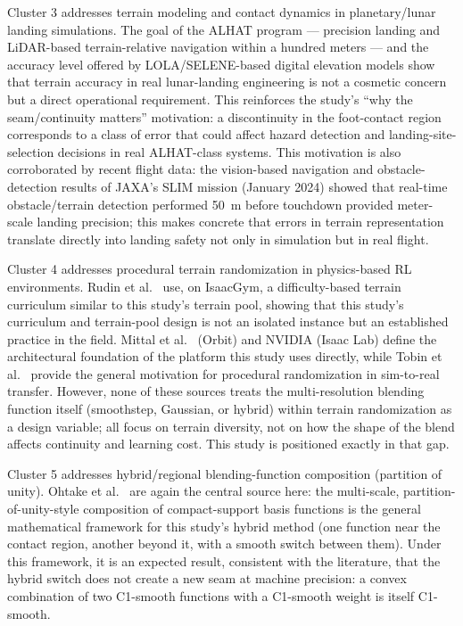 Cluster 3 addresses terrain modeling and contact dynamics in
planetary/lunar landing simulations. The goal of the ALHAT program
\citep{johnson2008overview,nasajpl_alhat} --- precision landing and
LiDAR-based terrain-relative navigation within a hundred meters --- and
the accuracy level offered by LOLA/SELENE-based digital elevation models
\citep{barker2016lunar} show that terrain accuracy in real lunar-landing
engineering is not a cosmetic concern but a direct operational
requirement. This reinforces the study's ``why the
seam/continuity matters'' motivation: a discontinuity in the foot-contact
region corresponds to a class of error that could affect hazard
detection and landing-site-selection decisions in real ALHAT-class
systems. This motivation is also corroborated by recent flight data: the
vision-based navigation and obstacle-detection results of JAXA's SLIM
mission (January 2024) \citep{ishida2025vision} showed that real-time
obstacle/terrain detection performed 50~m before touchdown provided
meter-scale landing precision; this makes concrete that errors in
terrain representation translate directly into landing safety not only
in simulation but in real flight.

Cluster 4 addresses procedural terrain randomization in physics-based RL
environments. Rudin et al.\ \citep{rudin2022walking} use, on IsaacGym, a
difficulty-based terrain curriculum similar to this study's terrain
pool, showing that this study's curriculum and terrain-pool design is
not an isolated instance but an established practice in the field.
Mittal et al.\ \citep{mittal2023orbit} (Orbit) and NVIDIA
\citep{nvidia2025isaaclab} (Isaac Lab) define the architectural
foundation of the platform this study uses directly, while Tobin et
al.\ \citep{tobin2017domain} provide the general motivation for
procedural randomization in sim-to-real transfer. However, none of these
sources treats the multi-resolution blending function itself
(smoothstep, Gaussian, or hybrid) within terrain randomization as a
design variable; all focus on terrain diversity, not on how the shape of
the blend affects continuity and learning cost. This study is positioned
exactly in that gap.

Cluster 5 addresses hybrid/regional blending-function composition
(partition of unity). Ohtake et al.\ \citep{ohtake2003multiscale} are
again the central source here: the multi-scale, partition-of-unity-style
composition of compact-support basis functions is the general
mathematical framework for this study's hybrid method (one function near
the contact region, another beyond it, with a smooth switch between
them). Under this framework, it is an expected result, consistent with
the literature, that the hybrid switch does not create a new seam at
machine precision: a convex combination of two C1-smooth functions with
a C1-smooth weight is itself C1-smooth.

